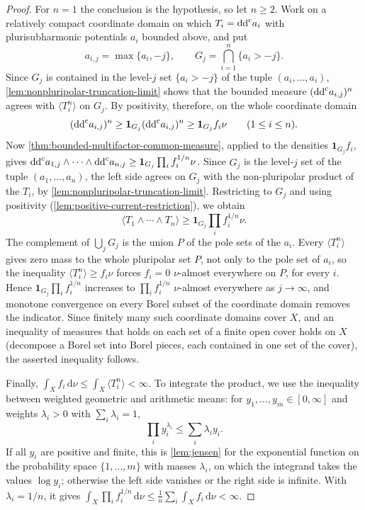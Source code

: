 \begin{proof}
For $n=1$ the conclusion is the hypothesis, so let $n\geq2$. Work on a relatively compact coordinate domain on which $T_i=\mathrm{dd}^{\mathrm{c}} a_i$ with plurisubharmonic potentials $a_i$ bounded above, and put
\[
 a_{i,j}=\max\{a_i,-j\},\qquad
 G_j=\bigcap_{i=1}^n\{a_i>-j\}.
\]
Since $G_j$ is contained in the level-$j$ set $\{a_i>-j\}$ of the tuple $(a_i,\ldots,a_i)$, \cref{lem:nonpluripolar-truncation-limit} shows that the bounded measure $(\mathrm{dd}^{\mathrm{c}} a_{i,j})^n$ agrees with $\langle T_i^n\rangle$ on $G_j$. By positivity, therefore, on the whole coordinate domain
\[
 (\mathrm{dd}^{\mathrm{c}} a_{i,j})^n\geq\mathbf1_{G_j}(\mathrm{dd}^{\mathrm{c}} a_{i,j})^n\geq\mathbf1_{G_j}f_i\nu
                         \qquad(1\leq i\leq n).
\]
Now \cref{thm:bounded-multifactor-common-measure}, applied to the densities $\mathbf1_{G_j}f_i$, gives $\mathrm{dd}^{\mathrm{c}} a_{1,j}\wedge\cdots\wedge\mathrm{dd}^{\mathrm{c}} a_{n,j}\geq\mathbf1_{G_j}\prod_if_i^{1/n}\nu$. Since $G_j$ is the level-$j$ set of the tuple $(a_1,\ldots,a_n)$, the left side agrees on $G_j$ with the non-pluripolar product of the $T_i$, by \cref{lem:nonpluripolar-truncation-limit}. Restricting to $G_j$ and using positivity (\cref{lem:positive-current-restriction}), we obtain
\[
 \langle T_1\wedge\cdots\wedge T_n\rangle
               \geq\mathbf1_{G_j}\prod_i f_i^{1/n}\nu .
\]
The complement of $\bigcup_jG_j$ is the union $P$ of the pole sets of the $a_i$. Every $\langle T_i^n\rangle$ gives zero mass to the whole pluripolar set $P$, not only to the pole set of $a_i$, so the inequality $\langle T_i^n\rangle\geq f_i\nu$ forces $f_i=0$ $\nu$-almost everywhere on $P$, for every $i$. Hence $\mathbf1_{G_j}\prod_if_i^{1/n}$ increases to $\prod_if_i^{1/n}$ $\nu$-almost everywhere as $j\to\infty$, and monotone convergence on every Borel subset of the coordinate domain removes the indicator. Since finitely many such coordinate domains cover $X$, and an inequality of measures that holds on each set of a finite open cover holds on $X$ (decompose a Borel set into Borel pieces, each contained in one set of the cover), the asserted inequality follows.

Finally, $\int_Xf_i\,\mathrm d\nu\leq\int_X\langle T_i^n\rangle<\infty$. To integrate the product, we use the inequality between weighted geometric and arithmetic means: for $y_1,\ldots,y_m\in[0,\infty]$ and weights $\lambda_i>0$ with $\sum_i\lambda_i=1$,
\begin{equation}\label{eq:weighted-geometric-arithmetic-mean}
 \prod_iy_i^{\lambda_i}\leq\sum_i\lambda_iy_i .
\end{equation}
If all $y_i$ are positive and finite, this is \cref{lem:jensen} for the exponential function on the probability space $\{1,\ldots,m\}$ with masses $\lambda_i$, on which the integrand takes the values $\log y_i$; otherwise the left side vanishes or the right side is infinite. With $\lambda_i=1/n$, it gives $\int_X\prod_if_i^{1/n}\,\mathrm d\nu\leq\frac1n\sum_i\int_Xf_i\,\mathrm d\nu<\infty$.
\end{proof}

